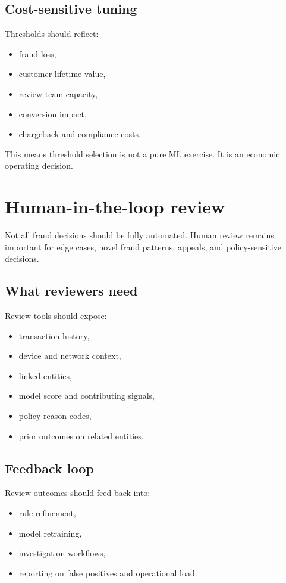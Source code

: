 \subsection{Cost-sensitive tuning}
Thresholds should reflect:
\begin{itemize}
  \item fraud loss,
  \item customer lifetime value,
  \item review-team capacity,
  \item conversion impact,
  \item chargeback and compliance costs.
\end{itemize}

This means threshold selection is not a pure ML exercise.
It is an economic operating decision.

\section{Human-in-the-loop review}
Not all fraud decisions should be fully automated.
Human review remains important for edge cases, novel fraud patterns, appeals, and policy-sensitive decisions.

\subsection{What reviewers need}
Review tools should expose:
\begin{itemize}
  \item transaction history,
  \item device and network context,
  \item linked entities,
  \item model score and contributing signals,
  \item policy reason codes,
  \item prior outcomes on related entities.
\end{itemize}

\subsection{Feedback loop}
Review outcomes should feed back into:
\begin{itemize}
  \item rule refinement,
  \item model retraining,
  \item investigation workflows,
  \item reporting on false positives and operational load.
\end{itemize}

